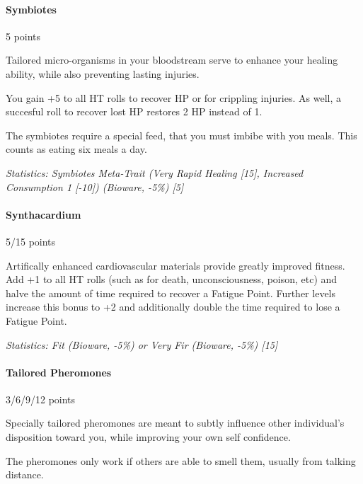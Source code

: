 \begin{multicols*}{3}
	\paragraph{Symbiotes}
	\begin{flushright}
		5 points
	\end{flushright}
	
	Tailored micro-organisms in your bloodstream serve to enhance your healing ability, while also preventing lasting injuries.
	
	You gain +5 to all HT rolls to recover HP or for crippling injuries. As well, a succesful roll to recover lost HP restores 2 HP instead of 1.
	
	The symbiotes require a special feed, that you must imbibe with you meals. This counts as eating six meals a day.
	
	\textit{\textcolor{OliveGreen}{Statistics: Symbiotes Meta-Trait (Very Rapid Healing [15], Increased Consumption 1 [-10]) (Bioware, -5\%) [5]}}
	
	\paragraph{Synthacardium}
	\begin{flushright}
		5/15 points
	\end{flushright}

	Artifically enhanced cardiovascular materials provide greatly improved fitness. Add +1 to all HT rolls (such as for death, unconsciousness, poison, etc) and halve the amount of time required to recover a Fatigue Point. Further levels increase this bonus to +2 and additionally double the time required to lose a Fatigue Point.
	
	\textit{\textcolor{OliveGreen}{Statistics: Fit (Bioware, -5\%) or Very Fir (Bioware, -5\%) [15]}}
	
	\paragraph{Tailored Pheromones}
	\begin{flushright}
		3/6/9/12 points
	\end{flushright}
	
	Specially tailored pheromones are meant to subtly influence other individual's disposition toward you, while improving your own self confidence. 
	
	The pheromones only work if others are able to smell them, usually from talking distance. 
	

\end{multicols*}
